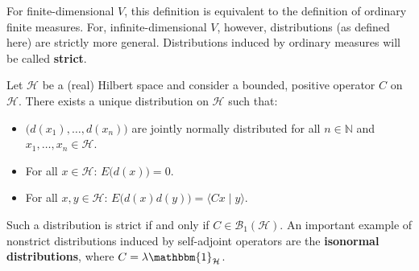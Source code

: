     \begin{remark}
        For finite-dimensional $V$, this definition is equivalent to the definition of ordinary finite measures. For, infinite-dimensional $V$, however, distributions (as defined here) are strictly more general. Distributions induced by ordinary measures will be called \textbf{strict}. 
    \end{remark}

    \begin{example}
        Let $\mathcal{H}$ be a (real) Hilbert space and consider a bounded, positive operator $C$ on $\mathcal{H}$. There exists a unique distribution on $\mathcal{H}$ such that:
        \begin{itemize}
            \item $\bigl(d(x_1),\ldots,d(x_n)\bigr)$ are jointly normally distributed for all $n\in\mathbb{N}$ and $x_1,\ldots,x_n\in\mathcal{H}$.
            \item For all $x\in\mathcal{H}$: $E\bigl(d(x)\bigr)=0$.
            \item For all $x,y\in\mathcal{H}$: $E\bigl(d(x)d(y)\bigr)=\langle Cx\mid y\rangle$.
        \end{itemize}
        Such a distribution is strict if and only if $C\in\mathcal{B}_1(\mathcal{H})$. An important example of nonstrict distributions induced by self-adjoint operators are the \textbf{isonormal distributions}, where $C=\lambda\mathbbm{1}_{\mathcal{H}}$.
    \end{example}

